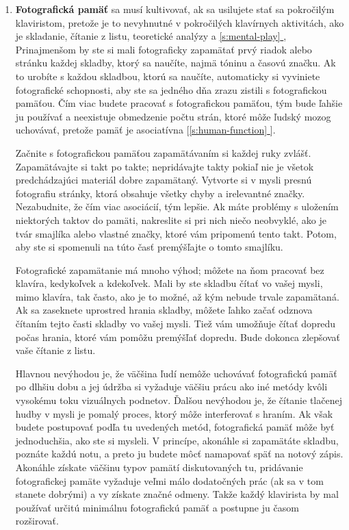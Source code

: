 \documentclass[11pt,a4paper]{book}
\newcommand*{\fullref}[1]{\hyperref[{#1}]{\ref*{#1} \nameref*{#1}}} %
\newcommand*{\fullrefp}[1]{[\fullref{#1}]} %
\begin{document}
\begin{enumerate}[(1)]
\item \textbf{Fotografická pamäť} sa musí kultivovať, ak sa usilujete stať sa pokročilým klaviristom, pretože je to nevyhnutné v pokročilých klavírnych aktivitách, ako je skladanie, čítanie z listu, teoretické analýzy a \fullref{s:mental-play}, Prinajmenšom by ste si mali fotograficky zapamätať prvý riadok alebo stránku každej skladby, ktorý sa naučíte, najmä tóninu a časovú značku. Ak to urobíte s každou skladbou, ktorú sa naučíte, automaticky si vyviniete fotografické schopnosti, aby ste sa jedného dňa zrazu zistili s fotografickou pamäťou. Čím viac budete pracovať s fotografickou pamäťou, tým bude ľahšie ju používať a neexistuje obmedzenie počtu strán, ktoré môže ľudský mozog uchovávať, pretože pamäť je asociatívna \fullrefp{s:human-function}.

Začnite s fotografickou pamäťou zapamätávaním si každej ruky zvlášť. Zapamätávajte si takt po takte; nepridávajte takty pokiaľ nie je všetok predchádzajúci materiál dobre zapamätaný. Vytvorte si v mysli presnú fotografiu stránky, ktorá obsahuje všetky chyby a irelevantné značky. Nezabudnite, že čím viac asociácií, tým lepšie. Ak máte problémy s uložením niektorých taktov do pamäti, nakreslite si pri nich niečo neobvyklé, ako je tvár smajlíka alebo vlastné značky, ktoré vám pripomenú tento takt. Potom, aby ste si spomenuli na túto časť premýšľajte o tomto smajlíku.

Fotografické zapamätanie má mnoho výhod; môžete na ňom pracovať bez klavíra, kedykoľvek a kdekoľvek. Mali by ste skladbu čítať vo vašej mysli, mimo klavíra, tak často, ako je to možné, až kým nebude trvale zapamätaná. Ak sa zaseknete uprostred hrania skladby, môžete ľahko začať odznova čítaním tejto časti skladby vo vašej mysli. Tiež vám umožňuje čítať dopredu počas hrania, ktoré vám pomôžu premýšľať dopredu. Bude dokonca zlepšovať vaše čítanie z listu.

Hlavnou nevýhodou je, že väčšina ľudí nemôže uchovávať fotografickú pamäť po dlhšiu dobu a jej údržba si vyžaduje väčšiu prácu ako iné metódy kvôli vysokému toku vizuálnych podnetov. Ďalšou nevýhodou je, že čítanie tlačenej hudby v mysli je pomalý proces, ktorý môže interferovať s hraním. Ak však budete postupovať podľa tu uvedených metód, fotografická pamäť môže byť jednoduchšia, ako ste si mysleli. V princípe, akonáhle si zapamätáte skladbu, poznáte každú notu, a preto ju budete môcť namapovať späť na notový zápis. Akonáhle získate väčšinu typov pamätí diskutovaných tu, pridávanie fotografickej pamäte vyžaduje veľmi málo dodatočných prác (ak sa v tom stanete dobrými) a vy získate značné odmeny. Takže každý klavirista by mal používať určitú minimálnu fotografickú pamäť a postupne ju časom rozširovať.


\end{enumerate}
\end{document}
